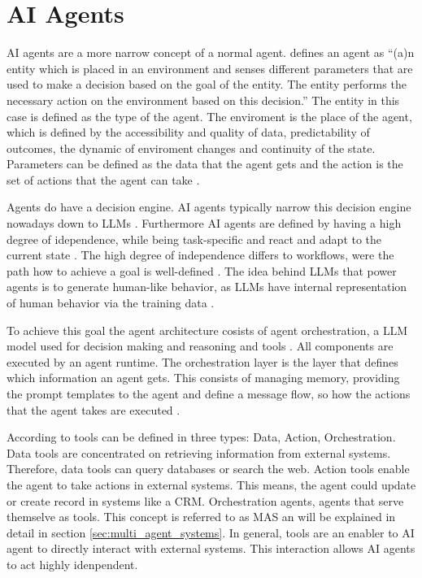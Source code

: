 \documentclass[a4paper,oneside,bibliography=totoc]{scrbook}
\begin{document}
\section{AI Agents}
\label{sec:ai_agents}

\ac{AI} agents are a more narrow concept of a normal agent. \citet{Dorri2018} defines an agent as \enquote{(a)n entity which is placed in an environment and senses different parameters that are used to make a decision based on the goal of the entity. The entity performs the necessary action on the environment based on this decision.} \cite[S. 28574]{Dorri2018} The entity in this case is defined as the type of the agent. The enviroment is the place of the agent, which is defined by the accessibility and quality of data, predictability of outcomes, the dynamic of enviroment changes and continuity of the state. Parameters can be defined as the data that the agent gets and the action is the set of actions that the agent can take \cite{Dorri2018}.

Agents do have a decision engine. \ac{AI} agents typically narrow this decision engine nowadays down to \acp{LLM} \cite{Sapkota2025,Park2023}. Furthermore \ac{AI} agents are defined by having a high degree of idependence, while being task-specific and react and adapt to the current state \cite{Sapkota2025,OpenAI2025}. The high degree of independence differs to workflows, were the path how to achieve a goal is well-defined \cite{Anthropic2024}. The idea behind \acp{LLM} that power agents is to generate human-like behavior, as \acp{LLM} have internal representation of human behavior via the training data \cite{Park2023}.

To achieve this goal the agent architecture cosists of agent orchestration, a \ac{LLM} model used for decision making and reasoning and tools \cite{Wiesinger2025,OpenAI2025}. All components are executed by an agent runtime. The orchestration layer is the layer that defines which information an agent gets. This consists of managing memory, providing the prompt templates to the agent and define a message flow, so how the actions that the agent takes are executed \cite{Wiesinger2025}.

According to \citet{OpenAI2025} tools can be defined in three types: Data, Action, Orchestration. Data tools are concentrated on retrieving information from external systems. Therefore, data tools can query databases or search the web. Action tools enable the agent to take actions in external systems. This means, the agent could update or create record in systems like a \ac{CRM}. Orchestration agents, agents that serve themselve as tools. This concept is referred to as \ac{MAS} an will be explained in detail in section \ref{sec:multi_agent_systems}. In general, tools are an enabler to AI agent to directly interact with external systems. This interaction allows \ac{AI} agents to act highly idenpendent.
\end{document}
